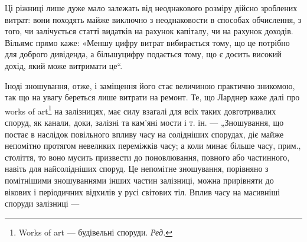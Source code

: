 Ці ріжниці лише дуже мало залежать від неоднакового розміру дійсно зроблених витрат: вони походять
майже виключно з неоднаковости в способах обчислення, з того, чи залічується статті видатків на
рахунок капіталу, чи на рахунок доходів. Вільямс прямо каже: «Меншу цифру витрат вибирається тому,
що це потрібно для доброго дивіденда, а більшуцифру подається тому, що є досить високий дохід, який
може витримати це“.

Іноді зношування, отже, і заміщення його стає величиною практично зникомою, так що на увагу береться
лише витрати на ремонт. Те, що Ларднер каже далі про works of art\footnote*{
Works of art — будівельні споруди. \emph{Ред.}
} на залізницях, має силу взагалі
для всіх таких довготривалих споруд, як канали, доки, залізні та кам’яні мости і т. ін. —
„Зношування, що постає в наслідок повільного впливу часу на солідніших спорудах, діє майже непомітно
протягом невеликих переміжків часу; а коли минає більше часу, прим., століття, то воно мусить
призвести до поновлювання, повного або частинного, навіть для найсолідніших споруд. Це непомітне
зношування, порівняно з помітнішими зношуваннями інших частин залізниці, можна прирівняти до вікових
і періодичних відхилів у русі світових тіл. Вплив часу на масивніші споруди залізниці —
\parbreak{}  %
